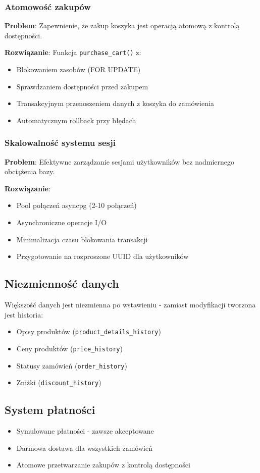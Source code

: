 \subsubsection*{Atomowość zakupów}
\textbf{Problem}: Zapewnienie, że zakup koszyka jest operacją atomową z kontrolą dostępności.

\textbf{Rozwiązanie}: Funkcja \texttt{purchase\_cart()} z:
\begin{itemize}
    \item Blokowaniem zasobów (FOR UPDATE)
    \item Sprawdzaniem dostępności przed zakupem
    \item Transakcyjnym przenoszeniem danych z koszyka do zamówienia
    \item Automatycznym rollback przy błędach
\end{itemize}

\subsubsection*{Skalowalność systemu sesji}
\textbf{Problem}: Efektywne zarządzanie sesjami użytkowników bez nadmiernego obciążenia bazy.

\textbf{Rozwiązanie}:
\begin{itemize}
    \item Pool połączeń asyncpg (2-10 połączeń)
    \item Asynchroniczne operacje I/O
    \item Minimalizacja czasu blokowania transakcji
    \item Przygotowanie na rozproszone UUID dla użytkowników
\end{itemize}

\subsection*{Niezmienność danych}
Większość danych jest niezmienna po wstawieniu - zamiast modyfikacji tworzona jest historia:
\begin{itemize}
    \item Opisy produktów (\texttt{product\_details\_history})
    \item Ceny produktów (\texttt{price\_history}) 
    \item Statusy zamówień (\texttt{order\_history})
    \item Zniżki (\texttt{discount\_history})
\end{itemize}

\subsection*{System płatności}
\begin{itemize}
    \item Symulowane płatności - zawsze akceptowane
    \item Darmowa dostawa dla wszystkich zamówień
    \item Atomowe przetwarzanie zakupów z kontrolą dostępności
\end{itemize}

